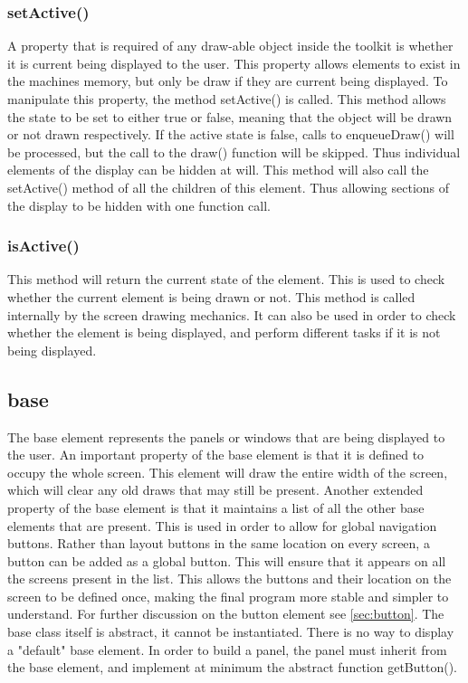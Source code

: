 
\subsubsection{setActive()}

A property that is required of any draw-able object inside the toolkit is whether it is current being displayed to the user. This property allows elements to exist in the machines memory, but only be draw if they are current being displayed. To manipulate this property, the method setActive() is called. This method allows the state to be set to either true or false, meaning that the object will be drawn or not drawn respectively. If the active state is false, calls to enqueueDraw() will be processed, but the call to the draw() function will be skipped. Thus individual elements of the display can be hidden at will. This method will also call the setActive() method of all the children of this element. Thus allowing sections of the display to be hidden with one function call.

\subsubsection{isActive()}

This method will return the current state of the element. This is used to check whether the current element is being drawn or not. This method is called internally by the screen drawing mechanics. It can also be used in order to check whether the element is being displayed, and perform different tasks if it is not being displayed.

\subsection{base}

The base element represents the panels or windows that are being displayed to the user. An important property of the base element is that it is defined to occupy the whole screen. This element will draw the entire width of the screen, which will clear any old draws that may still be present. Another extended property of the base element is that it maintains a list of all the other base elements that are present. This is used in order to allow for global navigation buttons. Rather than layout buttons in the same location on every screen, a button can be added as a global button. This will ensure that it appears on all the screens present in the list. This allows the buttons and their location on the screen to be defined once, making the final program more stable and simpler to understand.
For further discussion on the button element see \ref{sec:button}.
The base class itself is abstract, it cannot be instantiated. There is no way to display a "default" base element. In order to build a panel, the panel must inherit from the base element, and implement at minimum the abstract function getButton().


